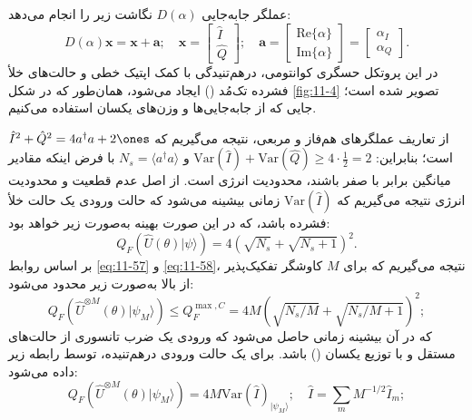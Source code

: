 عملگر جابه‌جایی $D(\alpha)$ نگاشت زیر را انجام می‌دهد:
\begin{equation}
	D(\alpha)\bm{x} = \bm{x} + \bm{a}; \quad \bm{x} = \begin{bmatrix} \hat{I} \\ \hat{Q} \end{bmatrix}; \quad \bm{a} = \begin{bmatrix} \text{Re}\{\alpha\} \\ \text{Im}\{\alpha\} \end{bmatrix} = \begin{bmatrix} \alpha_I \\ \alpha_Q \end{bmatrix}.
	\label{eq:11-61}
\end{equation}
در این پروتکل حسگری کوانتومی، درهم‌تنیدگی با کمک اپتیک خطی و حالت‌های خلأ فشرده تک‌مُد () ایجاد می‌شود، همان‌طور که در شکل \ref{fig:11-4} تصویر شده است؛ جایی که از جابه‌جایی‌ها و وزن‌های یکسان استفاده می‌کنیم.

از تعاریف عملگرهای هم‌فاز و مربعی، نتیجه می‌گیریم که $\hat{I}^2 + \hat{Q}^2 = 4a^\dagger a + 2\ones$ است؛ بنابراین:
$\text{Var}(\hat{I}) + \text{Var}(\hat{Q}) \geq 4 \cdot \frac{1}{2} = 2$ و $N_s = \langle a^\dagger a \rangle$ با فرض اینکه مقادیر میانگین برابر با صفر باشند، محدودیت انرژی است. از اصل عدم قطعیت و محدودیت انرژی نتیجه می‌گیریم که $\text{Var}(\hat{I})$ زمانی بیشینه می‌شود که حالت ورودی یک حالت خلأ فشرده باشد، که در این صورت  بهینه به‌صورت زیر خواهد بود:
\begin{equation}
	Q_F(\hat{U}(\theta)|\psi\rangle) = 4(\sqrt{N_s} + \sqrt{N_s + 1})^2.
	\label{eq:11-62}
\end{equation}
بر اساس روابط \eqref{eq:11-57} و \eqref{eq:11-58}، نتیجه می‌گیریم که  برای $M$ کاوشگر تفکیک‌پذیر از بالا به‌صورت زیر محدود می‌شود:
\begin{equation}
	Q_F(\hat{U}^{\otimes M}(\theta) | \psi_M \rangle) \leq Q_F^{\max, C} = 4M(\sqrt{N_s/M} + \sqrt{N_s/M + 1})^2;
	\label{eq:11-63}
\end{equation}
که در آن بیشینه  زمانی حاصل می‌شود که ورودی یک ضرب تانسوری از حالت‌های  مستقل و با توزیع یکسان () باشد.
برای یک حالت ورودی درهم‌تنیده،  توسط رابطه زیر داده می‌شود:
\begin{equation}
	Q_F(\hat{U}^{\otimes M}(\theta) | \psi_M \rangle) = 4M \text{Var}(\hat{I})_{|\psi_M\rangle}; \quad \hat{I} = \sum_{m} M^{-1/2} \hat{I}_m;
	\label{eq:11-64}
\end{equation}


